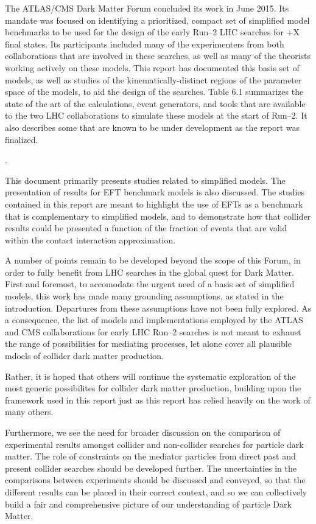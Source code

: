 The ATLAS/CMS Dark Matter Forum concluded its work in June 2015. Its mandate was focused on identifying a prioritized, compact set of simplified model benchmarks
to be used for the design of the early Run–2 LHC searches for \MET+X final states. Its participants included many of the experimenters from both collaborations that are involved in these searches, as well as many of the theorists working actively on these models.
This report has documented this basis set of models, as well as studies of the kinematically-distinct regions of the parameter space of the models, to aid the design of the searches.
Table 6.1 summarizes the state of the art of the calculations, event generators, and tools that are available to the two LHC collaborations to simulate these models at the start of Run–2. It also describes some that are known to be under development as the report was finalized.

.

This document primarily presents studies related to simplified models.
The presentation of results for EFT benchmark models is also discussed.
The studies contained in this report are meant to highlight the use of
EFTs as a benchmark that is complementary to simplified models,
and to demonstrate how that collider results could be presented a function of the
fraction of events that are valid within the contact interaction approximation.

A number of points remain to be developed beyond the scope of this Forum,
in order to fully benefit from LHC searches in the global quest for Dark Matter.
First and foremost, to accomodate the urgent need of a basis set of simplified models, 
this work has made many grounding assumptions, as stated in the introduction. Departures from these assumptions have not been fully explored.
As a consequence, the list of models and implementations employed by the ATLAS and CMS collaborations 
for early LHC Run–2 searches is not meant to exhaust the range of possibilities for mediating processes, 
let alone cover all plausible mdoels of collider dark matter production.

Rather, it is hoped that others will continue the systematic exploration of the most generic possibilites for collider dark matter production, building upon the framework used in this report just as this report has relied heavily on the work of many others. 

Furthermore, we see the need for broader discussion on the comparison
of experimental results amongst collider and non-collider searches for particle dark matter. The role of constraints on the mediator particles
from direct past and present collider searches should be developed further.
The uncertainties in the comparisons between experiments should be discussed and conveyed, so that the different results
can be placed in their correct context, and so we can collectively build a fair and comprehensive picture of our understanding of particle Dark Matter.
